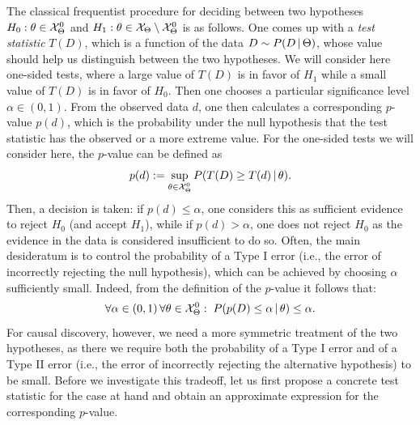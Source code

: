The classical frequentist procedure for deciding between two hypotheses $H_0 : \theta \in \mathcal{X}_\Theta^0$
and $H_1 : \theta \in \mathcal{X}_\Theta\setminus\mathcal{X}_\Theta^0$ is as follows.
One comes up with a \emph{test statistic} $T(D)$, which is a function of the data $D \sim P(D \operatorname*{|} \Theta)$, 
whose value should help us distinguish between the two hypotheses. 
We will consider here one-sided tests, where a large value of $T(D)$ is in favor of $H_1$ while a small value of $T(D)$ is in favor of $H_0$. 
Then one chooses a particular significance level $\alpha \in (0,1)$. From
the observed data $d$, one then calculates a corresponding $p$-value $p(d)$, which is the probability under 
the null hypothesis that the test statistic has the observed or a more extreme value. For the
one-sided tests we will consider here, the $p$-value can be defined as
$$p(d) := \sup_{\theta\in\mathcal{X}_\Theta^0} P(T(D) \ge T(d) \operatorname*{|} \theta).$$
Then, a decision is taken: if $p(d) \le \alpha$, one considers this as sufficient evidence to reject $H_0$ 
(and accept $H_1$), while if $p(d) > \alpha$, one does not reject $H_0$ as the evidence in the data 
is considered insufficient to do so.
Often, the main desideratum is to control the probability of a Type I error (i.e., the error of incorrectly
rejecting the null hypothesis), which can be achieved by choosing $\alpha$ sufficiently small.
Indeed, from the definition of the $p$-value it follows that:
  \[ \forall \alpha \in (0,1)\, \forall \theta \in \mathcal{X}_\Theta^0:\;  P( p(D) \le \alpha \operatorname*{|} \theta) \le \alpha.\]
For causal discovery, however, we need a more symmetric treatment of the two hypotheses, 
as there we require both the probability of a Type I error and of a Type II error (i.e., the error of incorrectly 
rejecting the alternative hypothesis) to be small. Before we investigate this
tradeoff, let us first propose a concrete test statistic for the case at hand and 
obtain an approximate expression for the corresponding $p$-value.

